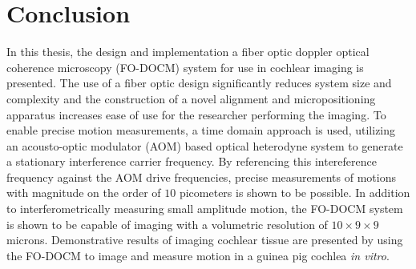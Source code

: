 
\section{Conclusion}

In this thesis, the design and implementation a fiber optic doppler optical coherence microscopy (FO-DOCM) system for use in cochlear imaging is presented. The use of a fiber optic design significantly reduces system size and complexity and the construction of a novel alignment and micropositioning apparatus increases ease of use for the researcher performing the imaging. To enable precise motion measurements, a time domain approach is used, utilizing an acousto-optic modulator (AOM) based optical heterodyne system to generate a stationary interference carrier frequency. By referencing this intereference frequency against the AOM drive frequencies, precise measurements of motions with magnitude on the order of $10$ picometers is shown to be possible. In addition to interferometrically measuring small amplitude motion, the FO-DOCM system is shown to be capable of imaging with a volumetric resolution of $10 \times 9 \times 9$ microns. Demonstrative results of imaging cochlear tissue are presented by using the FO-DOCM to image and measure motion in a guinea pig cochlea {\em in vitro}.
